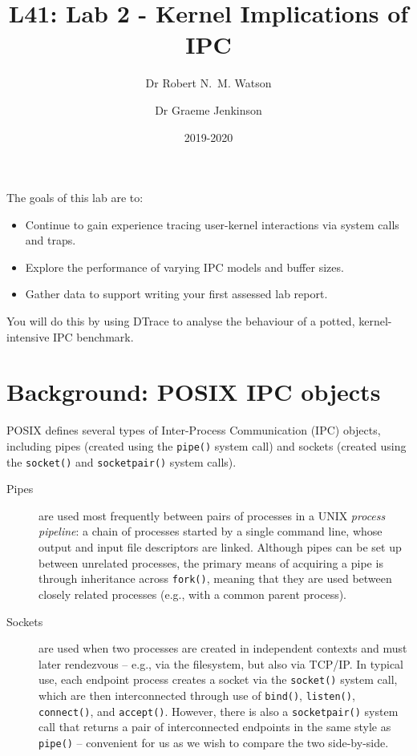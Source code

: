 \documentclass[a4paper,10pt]{article}
\begin{document}
\title{L41: Lab 2 - Kernel Implications of IPC}
\author{Dr Robert N.~M. Watson \and Dr Graeme Jenkinson}
\date{2019-2020}
\maketitle

%
%
%

\noindent
The goals of this lab are to:

\begin{itemize}
\item Continue to gain experience tracing user-kernel interactions via system calls and traps.
\item Explore the performance of varying IPC models and buffer sizes.
\item Gather data to support writing your first assessed lab report.
\end{itemize}

\noindent
You will do this by using DTrace to analyse the behaviour of a potted,
kernel-intensive IPC benchmark.

\section*{Background: POSIX IPC objects}

POSIX defines several types of Inter-Process Communication (IPC) objects,
including pipes (created using the \texttt{pipe()} system call) and sockets
(created using the \texttt{socket()} and \texttt{socketpair()} system calls).

\begin{description}
\item[Pipes] are used most frequently between pairs of processes in a UNIX
\textit{process pipeline}: a chain of processes started by a single command
line, whose output and input file descriptors are linked.
Although pipes can be set up between unrelated processes, the primary means of
acquiring a pipe is through inheritance across \texttt{fork()}, meaning that
they are used between closely related processes (e.g., with a common parent
process).

\item[Sockets] are used when two processes are created in independent contexts
and must later rendezvous -- e.g., via the filesystem, but also via TCP/IP.
In typical use, each endpoint process creates a socket via the
\texttt{socket()} system call, which are then interconnected through use of
\texttt{bind()}, \texttt{listen()}, \texttt{connect()}, and \texttt{accept()}.
However, there is also a \texttt{socketpair()} system call that returns a pair
of interconnected endpoints in the same style as \texttt{pipe()} -- convenient
for us as we wish to compare the two side-by-side.
\end{description}
\end{document}
